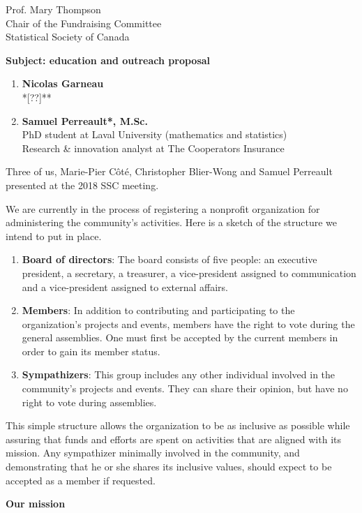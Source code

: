 \documentclass[11pt, a4paper]{letter} %
\begin{document}
\begin{letter}{
	Prof. Mary Thompson\\
	Chair of the Fundraising Committee\\
	Statistical Society of Canada
	
	\bigskip
	\textbf{Subject: education and outreach proposal}%
}
\begin{enumerate}
	\quad Assistant professor, École d'actuariat, Laval University
	\quad Teaching chair on big data analysis for actuariat science --- Intact
	\quad Member of the \emph{New Investigators Committee} of the \emph{SSC}
	\item[] \textbf{Nicolas Garneau}\\
	\quad **[??]**
	\item[] \textbf{Samuel Perreault*, M.Sc.}\\
	\quad PhD student at Laval University (mathematics and statistics)\\
	\quad Research \& innovation analyst at The Cooperators Insurance
\end{enumerate}

\noindent Three of us, Marie-Pier Côté, Christopher Blier-Wong and Samuel Perreault presented at the 2018 SSC meeting.


We are currently in the process of registering a nonprofit organization for administering the community's activities. Here is a sketch of the structure we intend to put in place.

\begin{enumerate}
	\item[] \textbf{Board of directors}: The board consists of five people: an executive president, a secretary, a treasurer, a vice-president assigned to communication and a vice-president assigned to external affairs.
	\item[] \textbf{Members}: In addition to contributing and participating to the organization's projects and events, members have the right to vote during the general assemblies. One must first be accepted by the current members in order to gain its member status.
	\item[] \textbf{Sympathizers}: This group includes any other individual involved in the community's projects and events. They can share their opinion, but have no right to vote during assemblies.
\end{enumerate}

This simple structure allows the organization to be as inclusive as possible while assuring that funds and efforts are spent on activities that are aligned with its mission. Any sympathizer minimally involved in the community, and demonstrating that he or she shares its inclusive values, should expect to be accepted as a member if requested.

\bigskip
\noindent \textbf{Our mission}


\end{letter}
\end{document}
